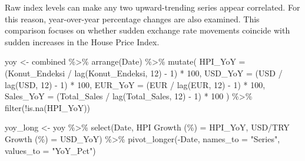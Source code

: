 \documentclass[
  11pt,
  a4paper,
  DIV=11,
  numbers=noendperiod]{scrartcl}
\newenvironment{Shaded}{\begin{snugshade}}{\end{snugshade}}
\newcommand{\AttributeTok}[1]{\textcolor[rgb]{0.40,0.45,0.13}{#1}}
\newcommand{\DecValTok}[1]{\textcolor[rgb]{0.68,0.00,0.00}{#1}}
\newcommand{\FunctionTok}[1]{\textcolor[rgb]{0.28,0.35,0.67}{#1}}
\newcommand{\NormalTok}[1]{\textcolor[rgb]{0.00,0.23,0.31}{#1}}
\newcommand{\OtherTok}[1]{\textcolor[rgb]{0.00,0.23,0.31}{#1}}
\newcommand{\SpecialCharTok}[1]{\textcolor[rgb]{0.37,0.37,0.37}{#1}}
\newcommand{\StringTok}[1]{\textcolor[rgb]{0.13,0.47,0.30}{#1}}
\begin{document}
Raw index levels can make any two upward-trending series appear
correlated. For this reason, year-over-year percentage changes are also
examined. This comparison focuses on whether sudden exchange rate
movements coincide with sudden increases in the House Price Index.

\begin{Shaded}
\begin{Highlighting}[]
\NormalTok{yoy }\OtherTok{\textless{}{-}}\NormalTok{ combined }\SpecialCharTok{\%\textgreater{}\%}
  \FunctionTok{arrange}\NormalTok{(Date) }\SpecialCharTok{\%\textgreater{}\%}
  \FunctionTok{mutate}\NormalTok{(}
    \AttributeTok{HPI\_YoY =}\NormalTok{ (Konut\_Endeksi }\SpecialCharTok{/} \FunctionTok{lag}\NormalTok{(Konut\_Endeksi, }\DecValTok{12}\NormalTok{) }\SpecialCharTok{{-}} \DecValTok{1}\NormalTok{) }\SpecialCharTok{*} \DecValTok{100}\NormalTok{,}
    \AttributeTok{USD\_YoY =}\NormalTok{ (USD }\SpecialCharTok{/} \FunctionTok{lag}\NormalTok{(USD, }\DecValTok{12}\NormalTok{) }\SpecialCharTok{{-}} \DecValTok{1}\NormalTok{) }\SpecialCharTok{*} \DecValTok{100}\NormalTok{,}
    \AttributeTok{EUR\_YoY =}\NormalTok{ (EUR }\SpecialCharTok{/} \FunctionTok{lag}\NormalTok{(EUR, }\DecValTok{12}\NormalTok{) }\SpecialCharTok{{-}} \DecValTok{1}\NormalTok{) }\SpecialCharTok{*} \DecValTok{100}\NormalTok{,}
    \AttributeTok{Sales\_YoY =}\NormalTok{ (Total\_Sales }\SpecialCharTok{/} \FunctionTok{lag}\NormalTok{(Total\_Sales, }\DecValTok{12}\NormalTok{) }\SpecialCharTok{{-}} \DecValTok{1}\NormalTok{) }\SpecialCharTok{*} \DecValTok{100}
\NormalTok{  ) }\SpecialCharTok{\%\textgreater{}\%}
  \FunctionTok{filter}\NormalTok{(}\SpecialCharTok{!}\FunctionTok{is.na}\NormalTok{(HPI\_YoY))}

\NormalTok{yoy\_long }\OtherTok{\textless{}{-}}\NormalTok{ yoy }\SpecialCharTok{\%\textgreater{}\%}
  \FunctionTok{select}\NormalTok{(Date, }\StringTok{\textasciigrave{}}\AttributeTok{HPI Growth (\%)}\StringTok{\textasciigrave{}} \OtherTok{=}\NormalTok{ HPI\_YoY, }\StringTok{\textasciigrave{}}\AttributeTok{USD/TRY Growth (\%)}\StringTok{\textasciigrave{}} \OtherTok{=}\NormalTok{ USD\_YoY) }\SpecialCharTok{\%\textgreater{}\%}
  \FunctionTok{pivot\_longer}\NormalTok{(}\SpecialCharTok{{-}}\NormalTok{Date, }\AttributeTok{names\_to =} \StringTok{"Series"}\NormalTok{, }\AttributeTok{values\_to =} \StringTok{"YoY\_Pct"}\NormalTok{)}


\end{Highlighting}
\end{Shaded}
\end{document}
